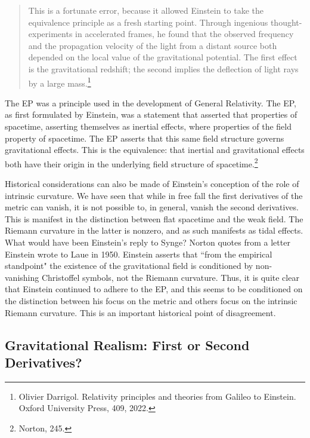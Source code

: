 \documentclass[11pt]{article}
\begin{document}
\begin{quote}
    This is a fortunate error, because it allowed Einstein to take the equivalence principle as a fresh starting point. Through ingenious thought-experiments in accelerated frames, he found that the observed frequency and the propagation velocity of the light from a distant source both depended on the local value of the gravitational potential. The first effect is the gravitational redshift; the second implies the deflection of light rays by a large mass.\footnote{Olivier Darrigol. Relativity principles and theories from Galileo to Einstein. Oxford University Press, 409, 2022.}
\end{quote}

The EP was a principle used in the development of General Relativity. The EP, as first formulated by Einstein, was a statement that asserted that properties of spacetime, asserting themselves as inertial effects, where properties of the field property of spacetime. The EP asserts that this same field structure governs gravitational effects. This is the equivalence: that inertial and gravitational effects both have their origin in the underlying field structure of spacetime.\footnote{Norton, 245.} 

Historical considerations can also be made of Einstein's conception of the role of intrinsic curvature. We have seen that while in free fall the first derivatives of the metric can vanish, it is not possible to, in general, vanish the second derivatives. This is manifest in the distinction between flat spacetime and the weak field. The Riemann curvature in the latter is nonzero, and as such manifests as tidal effects. What would have been Einstein's reply to Synge? Norton quotes from a letter Einstein wrote to Laue in 1950. Einstein asserts that “from the empirical standpoint" the existence of the gravitational field is conditioned by non-vanishing Christoffel symbols, not the Riemann curvature. Thus, it is quite clear that Einstein continued to adhere to the EP, and this seems to be conditioned on the distinction between his focus on the metric and others focus on the intrinsic Riemann curvature. This is an important historical point of disagreement.

\subsection{Gravitational Realism: First or Second Derivatives?}
\end{document}
